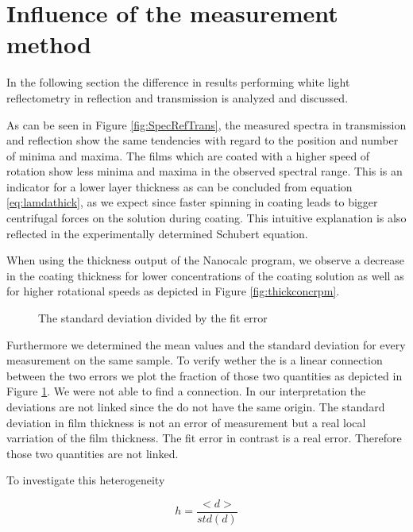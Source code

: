 \section{Influence of the measurement method}
\label{sec:Method}

In the following section the difference in results performing white light reflectometry in reflection
and transmission is analyzed and discussed.

As can be seen in Figure \ref{fig:SpecRefTrans}, the measured spectra in transmission and reflection show the same tendencies with regard to the position and number of minima and maxima. The films which are coated with a higher speed of rotation show less minima and maxima in the 
observed spectral range. This is an indicator for a lower layer thickness as can be concluded from equation \ref{eq:lamdathick}, as we expect since faster spinning in coating leads to 
bigger centrifugal forces on the solution during coating. This intuitive explanation is also reflected in the experimentally determined Schubert equation. 

When using the thickness output of the Nanocalc program, we observe a decrease in the coating thickness for lower concentrations of the coating solution as well as for higher rotational speeds as depicted in Figure \ref{fig:thickconcrpm}.

\begin{figure}[h]
    \centering
    
    \caption{The standard deviation divided by the fit error}
    \label{fig:errorFrac}

\end{figure}

Furthermore we determined the mean values and the standard deviation for every measurement on the same sample. To verify wether the is a 
linear connection between the two errors we plot the fraction of those two quantities as depicted in Figure \ref{fig:errorFrac}. We were not able to find a connection.
In our interpretation the deviations are not linked since the do not have the same origin. The standard deviation in film thickness is 
not an error of measurement but a real local varriation of the film  thickness. The fit error in contrast is a real error. Therefore those two quantities are not linked.



To investigate this heterogeneity

\begin{equation}
    h = \frac{< d >}{std(d)}
\end{equation}


